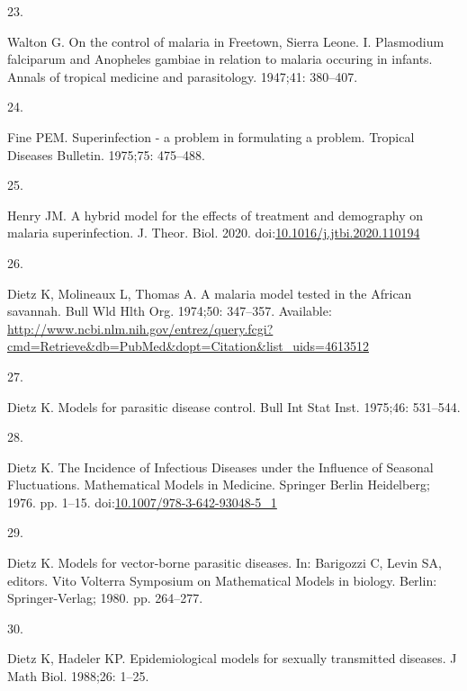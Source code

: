 \documentclass[
]{book}
\newlength{\cslhangindent}
\newlength{\csllabelwidth}
\newlength{\cslentryspacingunit} %
\newenvironment{CSLReferences}[2] %
 {%
  \setlength{\parindent}{0pt}
  \ifodd #1
  \let\oldpar\par
  \def\par{\hangindent=\cslhangindent\oldpar}
  \fi
  \setlength{\parskip}{#2\cslentryspacingunit}
 }%
 {}
\newcommand{\CSLLeftMargin}[1]{\parbox[t]{\csllabelwidth}{#1}}
\newcommand{\CSLRightInline}[1]{\parbox[t]{\linewidth - \csllabelwidth}{#1}\break}
\begin{document}
\begin{CSLReferences}{0}{0}
\leavevmode{}%
\CSLLeftMargin{23. }%
\CSLRightInline{Walton G. On the control of malaria in {Freetown}, {Sierra Leone}. {I}. {Plasmodium} falciparum and {Anopheles} gambiae in relation to malaria occuring in infants. Annals of tropical medicine and parasitology. 1947;41: 380--407. }

\leavevmode{}%
\CSLLeftMargin{24. }%
\CSLRightInline{Fine PEM. Superinfection - a problem in formulating a problem. Tropical Diseases Bulletin. 1975;75: 475--488. }

\leavevmode{}%
\CSLLeftMargin{25. }%
\CSLRightInline{Henry JM. A hybrid model for the effects of treatment and demography on malaria superinfection. J. Theor. Biol. 2020. doi:\href{https://doi.org/10.1016/j.jtbi.2020.110194}{10.1016/j.jtbi.2020.110194}}

\leavevmode{}%
\CSLLeftMargin{26. }%
\CSLRightInline{Dietz K, Molineaux L, Thomas A. A malaria model tested in the {African} savannah. Bull Wld Hlth Org. 1974;50: 347--357. Available: \url{http://www.ncbi.nlm.nih.gov/entrez/query.fcgi?cmd=Retrieve\&db=PubMed\&dopt=Citation\&list_uids=4613512}}

\leavevmode{}%
\CSLLeftMargin{27. }%
\CSLRightInline{Dietz K. Models for parasitic disease control. Bull Int Stat Inst. 1975;46: 531--544. }

\leavevmode{}%
\CSLLeftMargin{28. }%
\CSLRightInline{Dietz K. The {Incidence} of {Infectious Diseases} under the {Influence} of {Seasonal Fluctuations}. Mathematical {Models} in {Medicine}. {Springer Berlin Heidelberg}; 1976. pp. 1--15. doi:\href{https://doi.org/10.1007/978-3-642-93048-5_1}{10.1007/978-3-642-93048-5\_1}}

\leavevmode{}%
\CSLLeftMargin{29. }%
\CSLRightInline{Dietz K. Models for vector-borne parasitic diseases. In: Barigozzi C, Levin SA, editors. Vito {Volterra Symposium} on {Mathematical Models} in biology. {Berlin}: {Springer-Verlag}; 1980. pp. 264--277. }

\leavevmode{}%
\CSLLeftMargin{30. }%
\CSLRightInline{Dietz K, Hadeler KP. Epidemiological models for sexually transmitted diseases. J Math Biol. 1988;26: 1--25. }


\end{CSLReferences}
\end{document}
